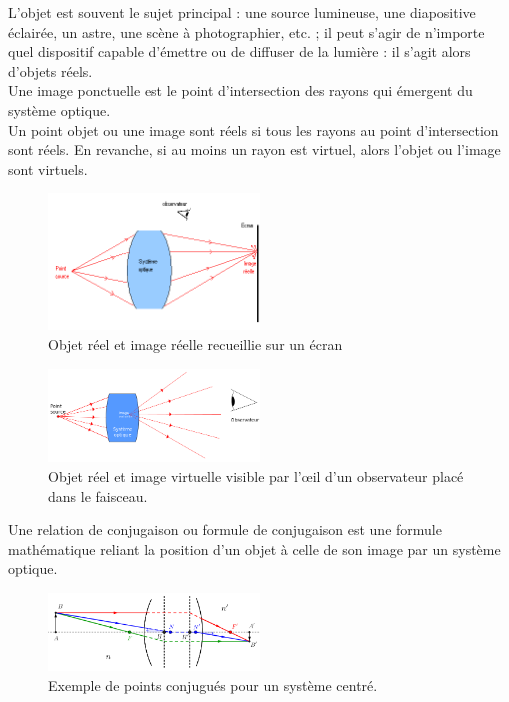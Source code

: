 \documentclass[a4paper,11pt]{article}
\begin{document}
\begin{defi}
L'objet est souvent le sujet principal : une source lumineuse, une diapositive éclairée, un astre, une scène à photographier, etc. ; il peut s'agir de n'importe quel dispositif capable d'émettre ou de diffuser de la lumière : il s'agit alors d'objets réels. 
\\ Une image ponctuelle est le point d'intersection des rayons qui émergent du système optique.
\\Un point objet ou une image sont réels si tous les rayons au point d'intersection sont réels. En revanche, si au moins un rayon est virtuel, alors l'objet ou l'image sont virtuels.
\begin{figure}[h]
\caption{Objet réel et image réelle recueillie sur un écran}
\centering
\includegraphics[width=0.5\textwidth]{Sys_optique2}
\end{figure}
\begin{figure}[h]
\caption{Objet réel et image virtuelle visible par l'œil d'un observateur placé dans le faisceau.}
\centering
\includegraphics[width=0.5\textwidth]{Sys_optique_virt}
\end{figure}

\end{defi}
\begin{defi}
Une relation de conjugaison ou formule de conjugaison est une formule mathématique reliant la position d'un objet à celle de son image par un système optique.
\begin{figure}[h]
  \caption{Exemple de points conjugués pour un système centré.}
  \centering
  \includegraphics[width=0.5\textwidth]{Système_centré_02}
\end{figure}
\end{defi}
\end{document}
